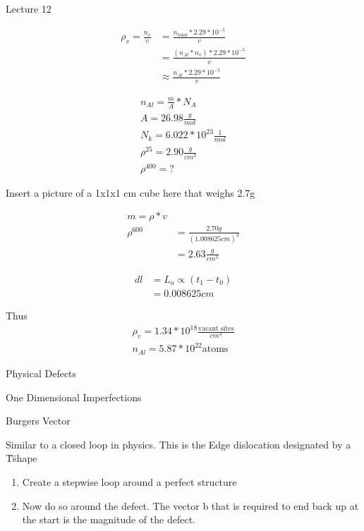 \documentclass{article}
\begin{document}
\Huge
Lecture 12

\normalsize

\begin{equation}
\begin{split}
\rho_v = \frac{n_v}{v}  &= \frac{n_{total} * 2.29*10^{-5}}{v} \\
                        &= \frac{(n_{Al} * n_v) * 2.29*10^{-5}}{v} \\
&\approx \frac{n_{Al} * 2.29*10^{-5}}{v}
\end{split}
\end{equation}

\begin{multline}
n_{Al} = \frac{m}{A} * N_A \\
A = 26.98 \frac{g}{mol} \\
N_k = 6.022 * 10^{23} \frac{1}{mol} \\
\rho^{25} = 2.90 \frac{g}{cm^3} \\
\rho^{400} = ?
\end{multline}

Insert a picture of a 1x1x1 cm cube here that weighs 2.7g 

\begin{equation}
\begin{split}
m = \rho * v \\
\rho^{600}  &= \frac{2.70g}{(1.008625 cm)^3} \\
            &= 2.63 \frac{g}{cm^3}
\end{split}
\end{equation}

\begin{equation}
\begin{split}
dl  &= L_o \propto (t_1 - t_0) \\
    &= 0.008625cm
\end{split}
\end{equation}

Thus 
\begin{equation}
\begin{split}
\rho_v = 1.34*10^{18} \frac{\text{vacant sites}}{cm^3}\\
n_{Al} = 5.87 * 10^{22} \text{atoms}
\end{split}
\end{equation}

\LARGE
Physical Defects

One Dimensional Imperfections

\large
Burgers Vector

\normalsize
Similar to a closed loop in physics. This is the Edge dislocation designated by a \"T\" shape
\begin{enumerate}
    \item Create a stepwise loop around a perfect structure
    \item Now do so around the defect. The vector b that is required to end back up at the start is the magnitude of the defect.
\end{enumerate}
\end{document}
